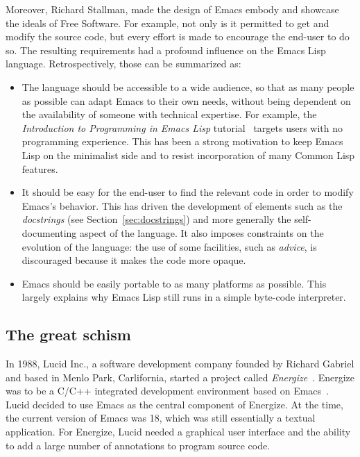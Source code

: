 \documentclass[format=acmsmall, review]{acmart}
\newcommand \Elisp {Emacs Lisp}
\begin{document}
Moreover, Richard Stallman, made the design of Emacs embody and showcase
the ideals of Free Software.  For example, not only is it permitted to get
and modify the source code, but every effort is made to encourage the
end-user to do so.  The resulting requirements had a profound influence on
the \Elisp{} language.  Retrospectively, those
can be summarized as:
\begin{itemize}
\item The language should be accessible to a wide audience, so that as many
  people as possible can adapt Emacs to their own needs, without being
  dependent on the availability of someone with technical expertise.
  For example, the
  \emph{Introduction to Programming in Emacs Lisp}
  tutorial~\citep{ElispIntro} targets users with no programming
  experience.  This has been a strong motivation to keep \Elisp{} on the
  minimalist side and to resist incorporation of many Common Lisp features.
\item It should be easy for the end-user to find the relevant code in order
  to modify Emacs's behavior.  This has driven the development of elements
  such as the \emph{docstrings} (see Section~\ref{sec:docstrings}) and more generally the self-documenting
  aspect of the language.  It also imposes constraints on the evolution of
  the language: the use of some facilities, such as \emph{advice}, is
  discouraged because it makes the code more opaque.
\item Emacs should be easily portable to as many platforms as possible.
  This largely explains why \Elisp{} still runs in a simple byte-code interpreter.
\end{itemize}

\subsection{The great schism}

In 1988, Lucid Inc., a software development company founded by Richard
Gabriel and based in Menlo
Park, Carlifornia, started a project called \emph{Energize}~\cite{GabrielEtAl1990,Gabriel-personal}.
Energize was to be a C/C++ integrated development environment based on
Emacs~\cite{GabrielLetter}.  Lucid decided to use Emacs as the central
component of Energize.  At the time, the current version of Emacs was
18, which was still essentially a textual application.
For Energize, Lucid needed a graphical user
interface and the ability to add a large number of annotations to
program source code.
\end{document}
